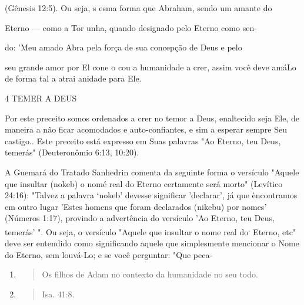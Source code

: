 (Gênesis 12:5). Ou seja, s esma forma que Abraham, sendo um amante do

Eterno --- como a Tor unha, quando designado pelo Eterno como sen-

do: 'Meu amado Abra pela força de sua concepção de Deus e pelo

seu grande amor por El cone o cou a humanidade a crer, assim você deve
amá­Lo de forma tal a atrai anidade para Ele.

4 TEMER A DEUS

Por este preceito somos ordenados a crer no temor a Deus, enalteci­do
seja Ele, de maneira a não ficar acomodados e auto-confiantes, e sim a
espe­rar sempre Seu castigo.. Este preceito está expresso em Suas
palavras "Ao Eter­no, teu Deus, temerás" (Deuteronômio 6:13, 10:20).

A Guemará do Tratado Sanhedrin comenta da seguinte forma o ver­sículo
"Aquele que insultar (nokeb) o nomé real do Eterno certamente será
mor­to" (Levítico 24:16): "Talvez a palavra `nokeb' devesse significar
'declarar', já que èncontramos em outro lugar 'Estes homens que foram
declarados (nikebu) por nomes' (Números 1:17), provindo a advertência do
versículo 'Ao Eterno, teu Deus, temerás' ". Ou seja, o versículo "Aquele
que insultar o nome real do\textsuperscript{.} Eterno, etc" deve ser
entendido como significando aquele que simplesmente mencionar o Nome do
Eterno, sem louvá-Lo; e se você perguntar: "Que peca-

\begin{enumerate}
\def\labelenumi{\arabic{enumi}.}
\setcounter{enumi}{26}
\item
  \begin{quote}
  Os filhos de Adam no contexto da humanidade no seu todo.
  \end{quote}
\item
  \begin{quote}
  Isa. 41:8.
  \end{quote}
\end{enumerate}

